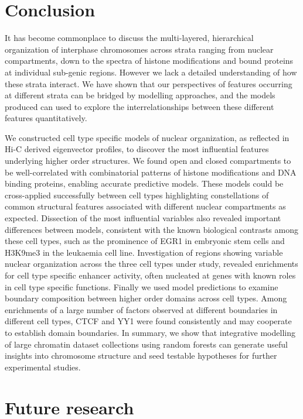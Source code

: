 \documentclass[a4paper,10pt,oneside]{book}
\begin{document}
\section{Conclusion}

It has become commonplace to discuss the multi-layered, hierarchical
organization of interphase chromosomes across strata ranging from
nuclear compartments, down to the spectra of histone modifications and
bound proteins at individual sub-genic regions. However we lack a
detailed understanding of how these strata interact. We have shown
that our perspectives of features occurring at different strata can be
bridged by modelling approaches, and the models produced can used to
explore the interrelationships between these different features
quantitatively. 

We constructed cell type specific models of nuclear
organization, as reflected in Hi-C derived eigenvector profiles, to
discover the most influential features underlying higher order
structures. We found open and closed compartments to be
well-correlated with combinatorial patterns of histone modifications
and DNA binding proteins, enabling accurate predictive models. These
models could be cross-applied successfully between cell types
highlighting constellations of common structural features associated
with different nuclear compartments as expected. Dissection of the
most influential variables also revealed important differences between
models, consistent with the known biological contrasts among these
cell types, such as the prominence of EGR1 in embryonic stem cells and
H3K9me3 in the leukaemia cell line. Investigation of regions showing
variable nuclear organization across the three cell types under study,
revealed enrichments for cell type specific enhancer activity, often
nucleated at genes with known roles in cell type specific
functions. Finally we used model predictions to examine boundary
composition between higher order domains across cell types. Among
enrichments of a large number of factors observed at different
boundaries in different cell types, CTCF and YY1 were found
consistently and may cooperate to establish domain boundaries. In
summary, we show that integrative modelling of large chromatin dataset
collections using random forests can generate useful insights into
chromosome structure and seed testable hypotheses for further
experimental studies.

\section{Future research}

\ifstandalone
\begin{small}

\end{small}
\fi
\end{document}
